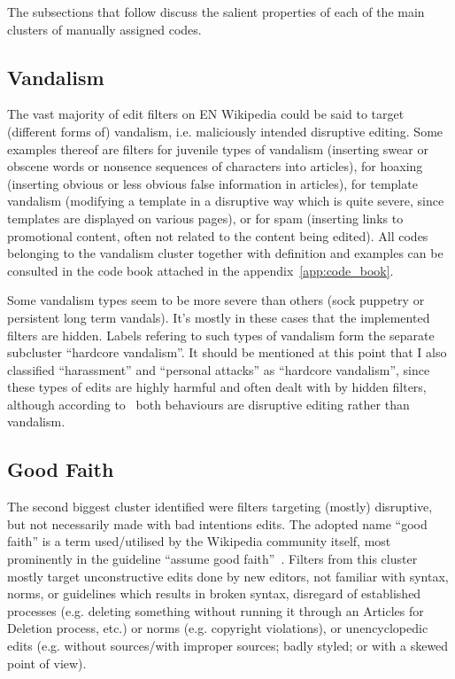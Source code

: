 The subsections that follow discuss the salient properties of each of the main clusters of manually assigned codes.

\subsection{Vandalism}

The vast majority of edit filters on EN Wikipedia could be said to target (different forms of) vandalism, i.e. maliciously intended disruptive editing.
Some examples thereof are filters for juvenile types of vandalism (inserting swear or obscene words or nonsence sequences of characters into articles), for hoaxing (inserting obvious or less obvious false information in articles), for template vandalism (modifying a template in a disruptive way which is quite severe, since templates are displayed on various pages), or for spam (inserting links to promotional content, often not related to the content being edited).
All codes belonging to the vandalism cluster together with definition and examples can be consulted in the code book attached in the appendix~\ref{app:code_book}.

Some vandalism types seem to be more severe than others (sock puppetry or persistent long term vandals).
It's mostly in these cases that the implemented filters are hidden.
Labels refering to such types of vandalism form the separate subcluster ``hardcore vandalism''. %
It should be mentioned at this point that I also classified ``harassment'' and ``personal attacks'' as ``hardcore vandalism'', since these types of edits are highly harmful and often dealt with by hidden filters, although according to~\cite{Wikipedia:Vandalism} both behaviours are disruptive editing rather than vandalism.

\subsection{Good Faith}

The second biggest cluster identified were filters targeting (mostly) disruptive, but not necessarily made with bad intentions edits.
The adopted name ``good faith'' is a term used/utilised by the Wikipedia community itself, most prominently in the guideline ``assume good faith''~\cite{Wikipedia:GoodFaith}.
Filters from this cluster mostly target unconstructive edits done by new editors, not familiar with syntax, norms, or guidelines which results in broken syntax, disregard of established processes (e.g. deleting something without running it through an Articles for Deletion process, etc.) or norms (e.g. copyright violations),  or unencyclopedic edits (e.g. without sources/with improper sources; badly styled; or with a skewed point of view).

